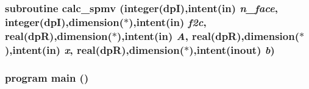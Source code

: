 \label{test_8f90_a638fb93022b93255d8000bacff09a674}
\hypertarget{test_8f90_a5595358e7ada913cd10a206235165422}{
\subsubsection[{calc\_\-spmv}]{\setlength{\rightskip}{0pt plus 5cm}subroutine calc\_\-spmv (integer(dpI),intent(in) {\em n\_\-face}, \/  integer(dpI),dimension($\ast$),intent(in) {\em f2c}, \/  real(dpR),dimension($\ast$),intent(in) {\em A}, \/  real(dpR),dimension($\ast$),intent(in) {\em x}, \/  real(dpR),dimension($\ast$),intent(inout) {\em b})}}
\label{test_8f90_a5595358e7ada913cd10a206235165422}
\hypertarget{test_8f90_a8ec2266d83cd6c0b762cbcbc92c0af3d}{
\subsubsection[{main}]{\setlength{\rightskip}{0pt plus 5cm}program main ()}}
\label{test_8f90_a8ec2266d83cd6c0b762cbcbc92c0af3d}
